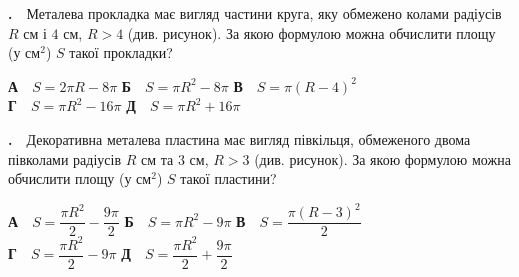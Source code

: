 \documentclass[12pt]{article}
\newcounter{zad}
\newcommand{\zadnum}{\stepcounter{zad}\textbf{\thezad.}\ \ }
\begin{document}
\vspace{0.2cm}
\noindent
\begin{minipage}[c]{0.6\textwidth}
\zadnum Металева прокладка має вигляд частини круга, яку обмежено колами радіусів $R$ см і $4$ см, $R>4$ (див. рисунок). За якою формулою можна обчислити площу (у см$^2$) $S$ такої прокладки?
\end{minipage}%
\hfill
\begin{minipage}[c]{0.38\textwidth}
\centering
{}
\end{minipage}
\par\vspace{0.1cm}
\begin{flushleft}
\textbf{А}\ \ $S = 2\pi R - 8\pi$ \qquad \textbf{Б}\ \ $S = \pi R^2 - 8\pi$ \qquad \textbf{В}\ \ $S = \pi(R-4)^2$\\[0.15cm]
\textbf{Г}\ \ $S = \pi R^2 - 16\pi$ \qquad \textbf{Д}\ \ $S = \pi R^2 + 16\pi$
\end{flushleft}
\vspace{0.2cm}
\noindent
\begin{minipage}[c]{0.6\textwidth}
\zadnum Декоративна металева пластина має вигляд півкільця, обмеженого двома півколами радіусів $R$ см та $3$ см, $R > 3$ (див. рисунок). За якою формулою можна обчислити площу (у см$^2$) $S$ такої пластини?
\end{minipage}%
\hfill
\begin{minipage}[c]{0.38\textwidth}
\centering
{}
\end{minipage}
\par\vspace{0.1cm}
\begin{flushleft}
\textbf{А}\ \ $S = \dfrac{\pi R^2}{2} - \dfrac{9\pi}{2}$ \qquad \textbf{Б}\ \ $S = \pi R^2 - 9\pi$ \qquad \textbf{В}\ \ $S = \dfrac{\pi(R-3)^2}{2}$\\[0.15cm]
\textbf{Г}\ \ $S = \dfrac{\pi R^2}{2} - 9\pi$ \qquad \textbf{Д}\ \ $S = \dfrac{\pi R^2}{2} + \dfrac{9\pi}{2}$
\end{flushleft}
\end{document}
